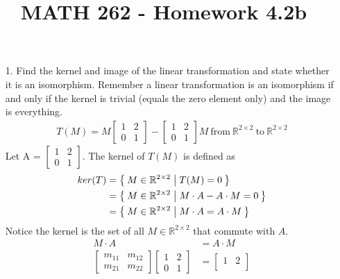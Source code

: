 \documentclass[letterpaper,12pt]{article}
\author{}
\title{MATH 262 - Homework 4.2b}
\date{} %
\begin{document}
\maketitle

\begin{enumerate}
  \item[1.]
    Find the kernel and image of the linear transformation and state whether it is an isomorphism. Remember a linear transformation is an isomorphism if and only if the kernel is trivial (equals the zero element only) and the image is everything.
    \begin{align*}
      T(M) = M
      \begin{bmatrix}
        1 & 2 \\
        0 & 1
      \end{bmatrix} -
      \begin{bmatrix}
        1 & 2 \\
        0 & 1
      \end{bmatrix}
      M \ \text{from} \ \mathbb{R}^{2 \times 2} \ \text{to} \ \mathbb{R}^{2 \times 2}
    \end{align*}
    Let A =
    $\begin{bmatrix}
      1 & 2 \\
      0 & 1
    \end{bmatrix}$.
    The kernel of $T(M)$ is defined as
    \begin{align*}
      ker(T) &= \Set{M \in \mathbb{R}^{2 \times 2} | T(M) = 0} \\
      &= \Set{
        M \in \mathbb{R}^{2 \times 2}
        | M \cdot A - A \cdot M = 0
      } \\
      &= \Set{
        M \in \mathbb{R}^{2 \times 2}
        | M \cdot A = A \cdot M
      }
    \end{align*}
    Notice the kernel is the set of all $M \in \mathbb{R}^{2 \times 2}$ that commute with $A$.
    \begin{align*}
      M \cdot A &= A \cdot M \\
      \begin{bmatrix}
        m_{11} & m_{12} \\
        m_{21} & m_{22}
      \end{bmatrix}
      \begin{bmatrix}
        1 & 2 \\
        0 & 1
      \end{bmatrix}
      &=
      \begin{bmatrix}
        1 & 2 \\

\end{bmatrix}
\end{align*}
\end{enumerate}
\end{document}
